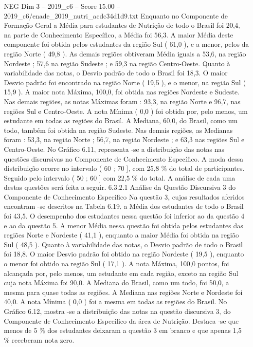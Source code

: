 \begin{textsample}{NEG Dim 3 – 2019\_c6 – Score 15.00 – 2019\_c6/enade\_2019\_nutri\_acdc34d1d9.txt}
Enquanto no Componente de Formação Geral a Média para estudantes de Nutrição de todo o Brasil foi 20,4, na parte de Conhecimento Específico, a Média foi 56,3.
A maior Média deste componente foi obtida pelos estudantes da região Sul ( 61,0 ), e a menor, pelos da região Norte ( 49,8 ).
As demais regiões obtiveram Média iguais a 53,6, na região Nordeste ; 57,6 na região Sudeste ; e 59,3 na região Centro-Oeste.
Quanto à variabilidade das notas, o Desvio padrão de todo o Brasil foi 18,3.
O maior Desvio padrão foi encontrado na região Norte ( 19,5 ), e o menor, na região Sul ( 15,9 ).
A maior nota Máxima, 100,0, foi obtida nas regiões Nordeste e Sudeste.
Nas demais regiões, as notas Máximas foram : 93,3, na região Norte e 96,7, nas regiões Sul e Centro-Oeste.
A nota Mínima ( 0,0 ) foi obtida por, pelo menos, um estudante em todas as regiões do Brasil.
A Mediana, 60,0, do Brasil, como um todo, também foi obtida na região Sudeste.
Nas demais regiões, as Medianas foram : 53,3, na região Norte ; 56,7, na região Nordeste ; e 63,3 nas regiões Sul e Centro-Oeste.
No Gráfico 6.11, representa -se a distribuição das notas nas questões discursivas no Componente de Conhecimento Específico.
A moda dessa distribuição ocorre no intervalo ( 60 ; 70 ], com 25,8 \% do total de participantes.
Seguido pelo intervalo ( 50 ; 60 ] com 22,5 \% do total.
A análise de cada uma destas questões será feita a seguir. 6.3.2.1 Análise da Questão Discursiva 3 do Componente de Conhecimento Específico Na questão 3, cujos resultados aferidos encontram -se descritos na Tabela 6.19, a Média dos estudantes de todo o Brasil foi 43,5.
O desempenho dos estudantes nessa questão foi inferior ao da questão 4 e ao da questão 5.
A menor Média nessa questão foi obtida pelos estudantes das regiões Norte e Nordeste ( 41,1 ), enquanto a maior Média foi obtida na região Sul ( 48,5 ).
Quanto à variabilidade das notas, o Desvio padrão de todo o Brasil foi 18,8.
O maior Desvio padrão foi obtido na região Nordeste ( 19,5 ), enquanto o menor foi obtido na região Sul ( 17,1 ).
A nota Máxima, 100,0 pontos, foi alcançada por, pelo menos, um estudante em cada região, exceto na região Sul cuja nota Máxima foi 90,0.
A Mediana do Brasil, como um todo, foi 50,0, a mesma para quase todas as regiões.
A Mediana nas regiões Norte e Nordeste foi 40,0.
A nota Mínima ( 0,0 ) foi a mesma em todas as regiões do Brasil.
No Gráfico 6.12, mostra -se a distribuição das notas na questão discursiva 3, do Componente de Conhecimento Específico da área de Nutrição.
Destaca -se que menos de 5 \% dos estudantes deixaram a questão 3 em branco e que apenas 1,5 \% receberam nota zero.

\end{textsample}
